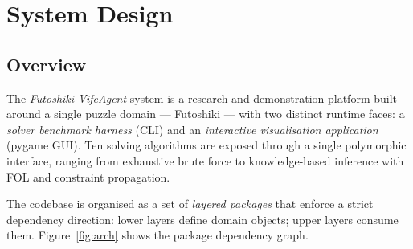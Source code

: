 \section{System Design}
\label{sec:system_design}

\subsection{Overview}

The \emph{Futoshiki VifeAgent} system is a research and demonstration platform
built around a single puzzle domain — Futoshiki — with two distinct runtime
faces: a \emph{solver benchmark harness} (CLI) and an \emph{interactive
visualisation application} (pygame GUI).
Ten solving algorithms are exposed through a single polymorphic interface,
ranging from exhaustive brute force to knowledge-based inference with FOL
and constraint propagation.

The codebase is organised as a set of \emph{layered packages} that enforce a
strict dependency direction: lower layers define domain objects; upper layers
consume them.
Figure~\ref{fig:arch} shows the package dependency graph.

